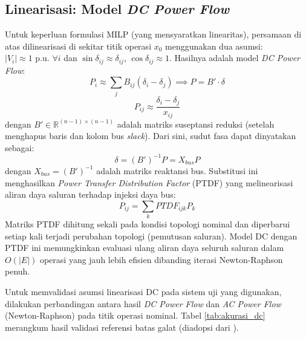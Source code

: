 \subsection{Linearisasi: Model \textit{DC Power Flow}}
\label{subsec:Linearisasi_Model_DC}

Untuk keperluan formulasi MILP (yang mensyaratkan linearitas), persamaan di atas dilinearisasi di sekitar titik operasi $x_{0}$ menggunakan dua asumsi: $|V_{i}| \approx 1 \text{ p.u.}$ $\forall i$ dan $\sin\delta_{ij} \approx \delta_{ij}$, $\cos\delta_{ij} \approx 1$. Hasilnya adalah model \textit{DC Power Flow}:
\begin{equation}
    P_{i} \approx \sum_{j}B_{ij}(\delta_{i}-\delta_{j}) \implies P = B'\cdot\delta
\end{equation}
\begin{equation}
    P_{ij} \approx \frac{\delta_{i}-\delta_{j}}{x_{ij}}
\end{equation}
dengan $B'\in\mathbb{R}^{(n-1)\times(n-1)}$ adalah matriks suseptansi reduksi (setelah menghapus baris dan kolom bus \textit{slack}). Dari sini, sudut fasa dapat dinyatakan sebagai:
\begin{equation}
    \delta = (B')^{-1}P = X_{bus}P
\end{equation}
dengan $X_{bus}=(B')^{-1}$ adalah matriks reaktansi bus. Substitusi ini menghasilkan \textit{Power Transfer Distribution Factor} (PTDF) yang melinearisasi aliran daya saluran terhadap injeksi daya bus:
\begin{equation}
    P_{ij} = \sum_{k} PTDF_{ijk} P_{k}
\end{equation}
Matriks PTDF dihitung sekali pada kondisi topologi nominal dan diperbarui setiap kali terjadi perubahan topologi (pemutusan saluran). Model DC dengan PTDF ini memungkinkan evaluasi ulang aliran daya seluruh saluran dalam $O(|E|)$ operasi yang jauh lebih efisien dibanding iterasi Newton-Raphson penuh.

Untuk memvalidasi asumsi linearisasi DC pada sistem uji yang digunakan, dilakukan perbandingan antara hasil \textit{DC Power Flow} dan \textit{AC Power Flow} (Newton-Raphson) pada titik operasi nominal. Tabel \ref{tab:akurasi_dc} merangkum hasil validasi referensi batas galat (diadopsi dari \cite{Farivar2013}).

